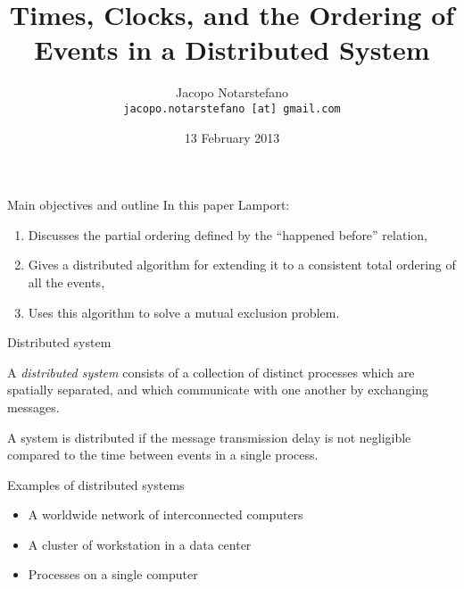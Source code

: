\documentclass[12pt]{beamer}
\title[Times, Clocks and the ordering of Events]{Times, Clocks, and the Ordering of Events in a Distributed System}
\author[Jacopo Notarstefano]{
    Jacopo Notarstefano\\
    \texttt{jacopo.notarstefano [at] gmail.com}
}
\date{13 February 2013}
\begin{document}
    \begin{frame}[plain]
        \titlepage
    \end{frame}

    \begin{frame}{Main objectives and outline}
        In this paper Lamport:
        \begin{enumerate}
            \item Discusses the partial ordering defined by the ``happened before''
            relation,
            \item Gives a distributed algorithm for extending it to a consistent total
            ordering of all the events,
            \item Uses this algorithm to solve a mutual exclusion problem.
        \end{enumerate}
    \end{frame}

    \begin{frame}{Distributed system}
        \begin{definition}
            A \emph{distributed system} consists of a collection of distinct processes
            which are spatially separated, and which communicate with one another
            by exchanging messages.

            A system is distributed if the message transmission delay is not
            negligible compared to the time between events in a single process.
        \end{definition}
    \end{frame}

    \begin{frame}{Examples of distributed systems}
        \begin{itemize}
            \item A worldwide network of interconnected computers
            \item A cluster of workstation in a data center
            \item Processes on a single computer
        \end{itemize}
    \end{frame}
\end{document}
